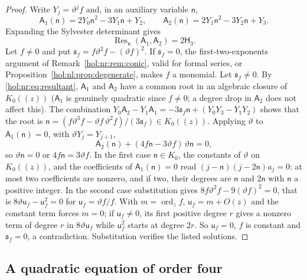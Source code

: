 \documentclass[11pt]{article}
\numberwithin{equation}{section}
\theoremstyle{definition}
\theoremstyle{remark}
\begin{document}
\begin{proof}
Write $Y_j=\vartheta^jf$ and, in an auxiliary variable $\mathsf n$,
\[
 \mathsf A_1(\mathsf n)=2Y_0\mathsf n^2-3Y_1\mathsf n+Y_2,\qquad
 \mathsf A_2(\mathsf n)=2Y_1\mathsf n^2-3Y_2\mathsf n+Y_3 .
\]
Expanding the Sylvester determinant gives
\begin{equation}\label{hol:nr:eq:resultant}
 \operatorname{Res}_{\mathsf n}(\mathsf A_1,\mathsf A_2)=2\mathsf H_3 .
\end{equation}
Let $f\ne0$ and put $\mathfrak s_f=f\vartheta^2f-(\vartheta f)^2$. If
$\mathfrak s_f=0$, the first-two-exponents argument of
Remark~\ref{hol:nr:rem:conic}, valid for formal series, or
Proposition~\ref{hol:nl:prop:degenerate}, makes $f$ a monomial. Let
$\mathfrak s_f\ne0$. By \eqref{hol:nr:eq:resultant}, $\mathsf A_1$ and
$\mathsf A_2$ have a common root in an algebraic closure of $K_0((z))$
($\mathsf A_1$ is genuinely quadratic since $f\ne0$; a degree drop in
$\mathsf A_2$ does not affect this). The combination
$Y_0\mathsf A_2-Y_1\mathsf A_1=-3\mathfrak s_f\mathsf n+(Y_0Y_3-Y_1Y_2)$ shows
that the root is
$\mathsf n=(f\vartheta^3f-\vartheta f\,\vartheta^2f)/(3\mathfrak s_f)\in
K_0((z))$. Applying $\vartheta$ to $\mathsf A_1(\mathsf n)=0$, with
$\vartheta Y_j=Y_{j+1}$,
\begin{equation}\label{hol:nr:eq:parameter}
 \mathsf A_2(\mathsf n)+(4f\mathsf n-3\vartheta f)\,\vartheta\mathsf n=0 ,
\end{equation}
so $\vartheta\mathsf n=0$ or $4f\mathsf n=3\vartheta f$. In the first case
$\mathsf n\in K_0$, the constants of $\vartheta$ on $K_0((z))$, and the
coefficients of $\mathsf A_1(\mathsf n)=0$ read $(j-\mathsf n)(j-2\mathsf n)
a_j=0$: at most two coefficients are nonzero, and if two, their degrees are
$\mathsf n$ and $2\mathsf n$ with $\mathsf n$ a positive integer. In the second
case substitution gives $8f\vartheta^2f-9(\vartheta f)^2=0$, that is
$8\vartheta\mathsf u_f-\mathsf u_f^2=0$ for $\mathsf u_f=\vartheta f/f$. With
$m=\operatorname{ord}_zf$, $\mathsf u_f=m+O(z)$ and the constant term forces
$m=0$; if $\mathsf u_f\ne0$, its first positive degree $r$ gives a nonzero term
of degree $r$ in $8\vartheta\mathsf u_f$ while $\mathsf u_f^2$ starts at degree
$2r$. So $\mathsf u_f=0$, $f$ is constant and $\mathfrak s_f=0$, a
contradiction. Substitution verifies the listed solutions.
\end{proof}

\subsection{A quadratic equation of order four}\label{hol:nr:sub:Q4}
\end{document}
